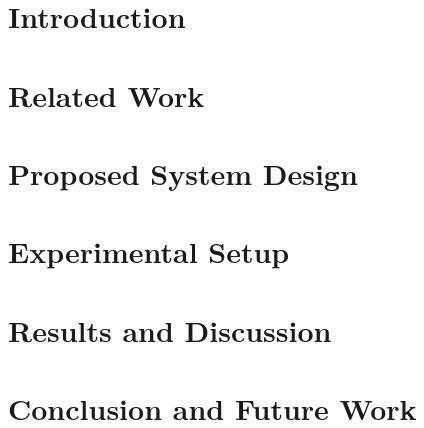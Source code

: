 \documentclass[runningheads]{llncs}
\begin{document}
\section{Introduction}
\label{sec:introduction}

\section{Related Work}
\label{sec:related_work}

\section{Proposed System Design}
\label{sec:system_design}

\section{Experimental Setup}
\label{sec:implement}

\section{Results and Discussion}
\label{sec:evaluation}

\section{Conclusion and Future Work}
\label{sec:conclusion}




\end{document}
